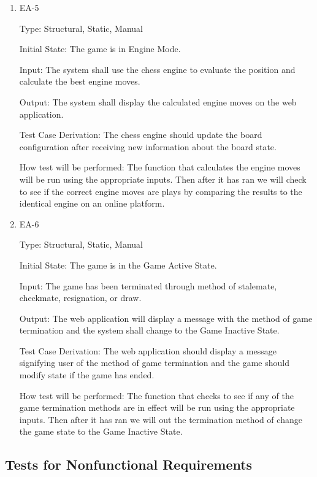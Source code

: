 \documentclass[12pt, titlepage]{article}
\begin{document}
\begin{enumerate}
    \item{EA-5\\}

    Type: Structural, Static, Manual
                      
    Initial State: The game is in Engine Mode.
                        
    Input: The system shall use the chess engine to evaluate the position and calculate the best
    engine moves.
                        
    Output: The system shall display the calculated engine moves on the web application.
                        
    Test Case Derivation: The chess engine should update the board configuration after receiving new information about the board state. 

    How test will be performed: The function that calculates the engine moves
    will be run using the appropriate inputs. Then after it has ran we will check to see if the correct engine moves are plays
    by comparing the results to the identical engine on an online platform.

    \item{EA-6\\}

    Type: Structural, Static, Manual
                      
    Initial State: The game is in the Game Active State.
                        
    Input: The game has been terminated through method of stalemate, checkmate, resignation, or draw.
                        
    Output: The web application will display a message with the method of game termination and the
    system shall change to the Game Inactive State.
                        
    Test Case Derivation: The web application should display a message signifying user of the method of game termination
    and the game should modify state if the game has ended.

    How test will be performed: The function that checks to see if any of the game termination methods are in effect
    will be run using the appropriate inputs. Then after it has ran we will out the termination method of change the
    game state to the Game Inactive State.

  \end{enumerate}
   

\subsection{Tests for Nonfunctional Requirements}
\end{document}
